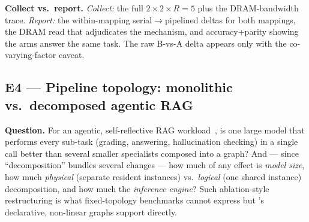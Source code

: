 \textbf{Collect vs.\ report.} \emph{Collect:} the full $2\times2 \times
R{=}5$ plus the DRAM-bandwidth trace. \emph{Report:} the within-mapping
serial$\to$pipelined deltas for both mappings, the DRAM read that
adjudicates the mechanism, and accuracy+parity showing the arms answer the
same task. The raw B-vs-A delta appears only with the co-varying-factor
caveat.

\subsection{E4 --- Pipeline topology: monolithic vs.\ decomposed agentic RAG}
\label{sec:e4-selfrag}

\textbf{Question.} For an agentic, self-reflective RAG
workload~\cite{asai2024selfrag}, is one large model that performs every
sub-task (grading, answering, hallucination checking) in a single call
better than several smaller specialists composed into a graph? And ---
since ``decomposition'' bundles several changes --- how much of any effect
is \emph{model size}, how much \emph{physical} (separate resident
instances) vs.\ \emph{logical} (one shared instance) decomposition, and how
much the \emph{inference engine}? Such ablation-style restructuring is what
fixed-topology benchmarks cannot express but \sysname{}'s declarative,
non-linear graphs support directly.

